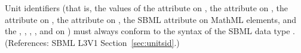 Unit identifiers (that is, the values of the  attribute on
\UnitDefinition, the  attribute on \Compartment, the
 attribute on \Parameter,  the  attribute
on \Species, the SBML  attribute on MathML 
elements, and the , ,
, ,  and
 on \Model) must always conform to the syntax of the
SBML data type .  (References: SBML L3V1
Section~\ref{sec:unitsid}.)
